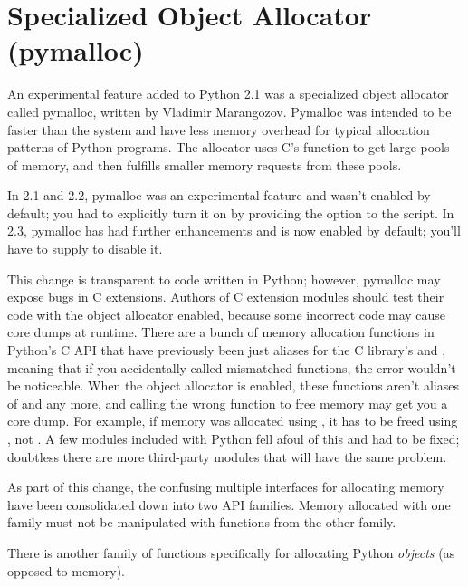 \documentclass{howto}
\begin{document}
\section{Specialized Object Allocator (pymalloc)\label{section-pymalloc}}

An experimental feature added to Python 2.1 was a specialized object
allocator called pymalloc, written by Vladimir Marangozov.  Pymalloc
was intended to be faster than the system  and have
less memory overhead for typical allocation patterns of Python
programs.  The allocator uses C's  function to get
large pools of memory, and then fulfills smaller memory requests from
these pools.

In 2.1 and 2.2, pymalloc was an experimental feature and wasn't
enabled by default; you had to explicitly turn it on by providing the
 option to the 
script.  In 2.3, pymalloc has had further enhancements and is now
enabled by default; you'll have to supply
 to disable it.

This change is transparent to code written in Python; however,
pymalloc may expose bugs in C extensions.  Authors of C extension
modules should test their code with the object allocator enabled,
because some incorrect code may cause core dumps at runtime.  There
are a bunch of memory allocation functions in Python's C API that have
previously been just aliases for the C library's 
and , meaning that if you accidentally called
mismatched functions, the error wouldn't be noticeable.  When the
object allocator is enabled, these functions aren't aliases of
 and  any more, and calling the
wrong function to free memory may get you a core dump.  For example,
if memory was allocated using , it has to
be freed using , not .  A
few modules included with Python fell afoul of this and had to be
fixed; doubtless there are more third-party modules that will have the
same problem.

As part of this change, the confusing multiple interfaces for
allocating memory have been consolidated down into two API families.
Memory allocated with one family must not be manipulated with
functions from the other family.

There is another family of functions specifically for allocating
Python \emph{objects} (as opposed to memory).
\end{document}
